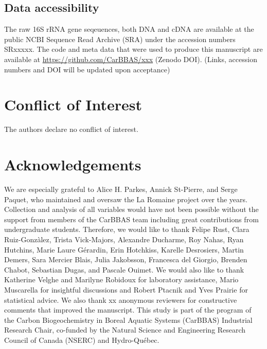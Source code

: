 \documentclass[12pt,a4paper]{article} %
\begin{document}


\subsection*{Data accessibility}
The raw 16S rRNA gene seqeuences, both DNA and cDNA are available at the public NCBI Sequence Read Archive (SRA) under the accession numbers SRxxxxx. The code and meta data that were used to produce this manuscript are available at \url{https://github.com/CarBBAS/xxx} (Zenodo DOI). (Links, accession numbers and DOI will be updated upon acceptance) \\

\section*{Conflict of Interest}
The authors declare no conflict of interest.

\section*{Acknowledgements}
We are especially grateful to Alice H. Parkes, Annick St-Pierre, and Serge Paquet, who maintained and oversaw the La Romaine project over the years. Collection and analysis of all variables would have not been possible without the support from members of the CarBBAS team including great contributions from undergraduate students. Therefore, we would like to thank Felipe Rust, Clara Ruiz-Gonz\`{a}lez, Trista Vick-Majors, Alexandre Ducharme, Roy Nahas, Ryan Hutchins, Marie Laure G\'{e}rardin,  Erin Hotchkiss, Karelle Desrosiers, Martin Demers, Sara Mercier Blais, Julia Jakobsson, Francesca del Giorgio, Brenden Chabot, Sebastian Dugas, and Pascale Ouimet. We would also like to thank Katherine Velghe and Marilyne Robidoux for laboratory assistance, Mario Muscarella for insightful discussions and Robert Ptacnik and Yves Prairie for statistical advice. We also thank xx anonymous reviewers for constructive comments that improved the manuscript. This study is part of the program of the Carbon Biogeochemistry in Boreal Aquatic Systems (CarBBAS) Industrial Research Chair, co-funded by the Natural Science and Engineering Research Council of Canada (NSERC) and Hydro-Qu\'{e}bec.
\end{document}
